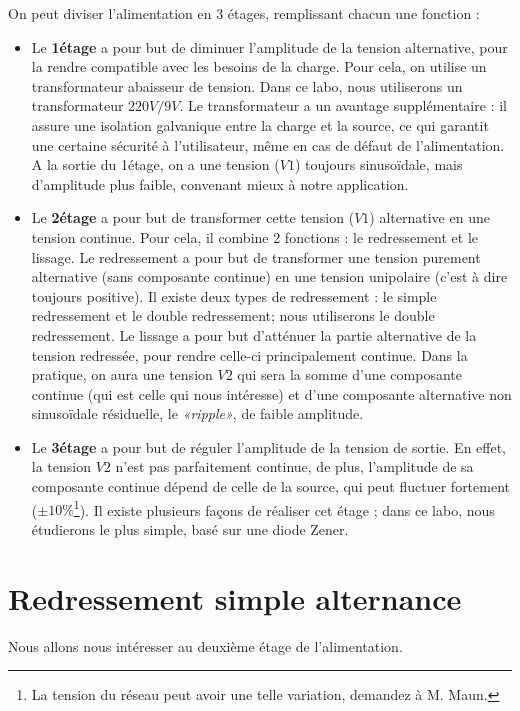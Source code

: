 \documentclass{../template/labo}
\begin{document}
On peut diviser l'alimentation en 3 étages, remplissant chacun une fonction :
\begin{itemize}
\item Le \textbf{1\ier étage} a pour but de diminuer l'amplitude de la tension alternative, pour la rendre compatible avec les besoins de la charge. Pour cela, on utilise un transformateur abaisseur de tension.
Dans ce labo, nous utiliserons un transformateur $220V/9V$.
Le transformateur a un avantage supplémentaire : il assure une isolation galvanique entre la charge et la source, ce qui garantit une certaine sécurité à l'utilisateur, même en cas de défaut de l'alimentation.
A la sortie du 1\ier étage, on a une tension ($V1$) toujours sinusoïdale, mais d'amplitude plus faible, convenant mieux à notre application.

\item Le \textbf{2\ieme étage} a pour but de transformer cette tension ($V1$) alternative en une tension continue. Pour cela, il combine 2 fonctions : le redressement et le lissage.
Le redressement a pour but de transformer une tension purement alternative (sans composante continue) en une tension unipolaire (c'est à dire toujours positive). Il existe deux types de redressement : le simple redressement et le double redressement; nous utiliserons le double redressement.
Le lissage a pour but d'atténuer la partie alternative de la tension redressée, pour rendre celle-ci principalement continue.
Dans la pratique, on aura une tension $V2$ qui sera la somme d'une composante continue (qui est celle qui nous intéresse) et d'une composante alternative non sinusoïdale résiduelle, le \textit{«ripple»}, de faible amplitude.

\item Le \textbf{3\ieme étage} a pour but de réguler l'amplitude de la tension de sortie. En effet, la tension $V2$ n'est pas parfaitement continue, de plus, l'amplitude de sa composante continue dépend de celle de la source, qui peut fluctuer fortement ($\pm10\%$\footnote{La tension du réseau peut avoir une telle variation, demandez à M. Maun.}). %
Il existe plusieurs façons de réaliser cet étage ; dans ce labo, nous étudierons le plus simple, basé sur une diode Zener.
\end{itemize}


\newpage
\section{Redressement simple alternance}
Nous allons nous intéresser au deuxième étage de l'alimentation.
\end{document}
